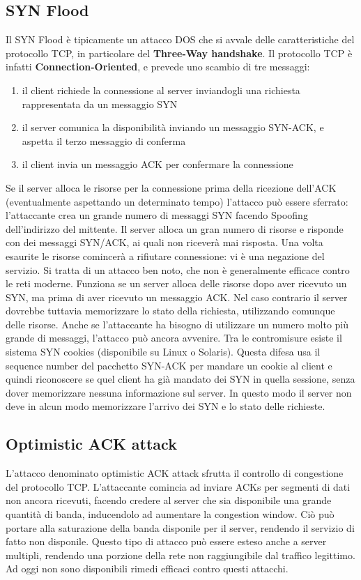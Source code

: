 \subsection{SYN Flood}
Il SYN Flood è tipicamente un attacco DOS che si avvale delle caratteristiche del protocollo TCP, in particolare del \textbf{Three-Way handshake}. Il protocollo TCP è infatti \textbf{Connection-Oriented}, e prevede uno scambio di tre messaggi:
\begin{enumerate}
\item il client richiede la connessione al server inviandogli una richiesta rappresentata da un messaggio SYN
\item il server comunica la disponibilità inviando un messaggio SYN-ACK, e aspetta il terzo messaggio di conferma
\item il client invia un messaggio ACK per confermare la connessione
\end{enumerate}
Se il server alloca le risorse per la connessione prima della ricezione dell'ACK (eventualmente aspettando un determinato tempo) l'attacco può essere sferrato: l'attaccante crea un grande numero di messaggi SYN facendo Spoofing dell'indirizzo del mittente. Il server alloca un gran numero di risorse e risponde con dei messaggi SYN/ACK, ai quali non riceverà mai risposta. Una volta esaurite le risorse comincerà a rifiutare connessione: vi è una negazione del servizio. 
\newline \newline
Si tratta di un attacco ben noto, che non è generalmente efficace contro le reti moderne. Funziona se un server alloca delle risorse dopo aver ricevuto un SYN, ma prima di aver ricevuto un messaggio ACK. 
\newline \newline
Nel caso contrario il server dovrebbe tuttavia memorizzare lo stato della richiesta, utilizzando comunque delle risorse. Anche se l'attaccante ha bisogno di utilizzare un numero molto più grande di messaggi, l'attacco può ancora avvenire. Tra le contromisure esiste il sistema SYN cookies (disponibile su Linux o Solaris). Questa difesa usa il sequence number del pacchetto SYN-ACK per mandare un cookie al client e quindi riconoscere se quel client ha già mandato dei SYN in quella sessione, senza dover memorizzare nessuna informazione sul server. In questo modo il server non deve in alcun modo memorizzare l'arrivo dei SYN e lo stato delle richieste.

\subsection{Optimistic ACK attack}
L'attacco denominato optimistic ACK attack sfrutta il controllo di congestione del protocollo TCP. L'attaccante comincia ad inviare ACKs per segmenti di dati non ancora ricevuti, facendo credere al server che sia disponibile una grande quantità di banda, inducendolo ad aumentare la congestion window. Ciò può portare alla saturazione della banda disponile per il server, rendendo il servizio di fatto non disponile. Questo tipo di attacco può essere esteso anche a server multipli, rendendo una porzione della rete non raggiungibile dal traffico legittimo. Ad oggi non sono disponibili rimedi efficaci contro questi attacchi.
